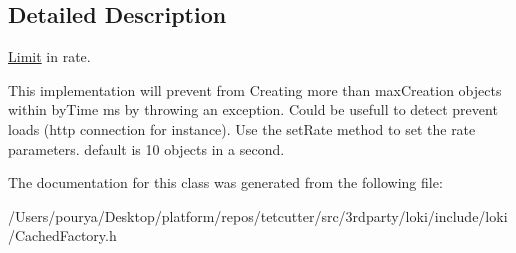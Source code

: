 \subsection{Detailed Description}
\hyperlink{classLimit}{Limit} in rate. 

This implementation will prevent from Creating more than max\+Creation objects within by\+Time ms by throwing an exception. Could be usefull to detect prevent loads (http connection for instance). Use the set\+Rate method to set the rate parameters. default is 10 objects in a second. 

The documentation for this class was generated from the following file\+:\begin{DoxyCompactItemize}
\item 
/\+Users/pourya/\+Desktop/platform/repos/tetcutter/src/3rdparty/loki/include/loki/Cached\+Factory.\+h\end{DoxyCompactItemize}
